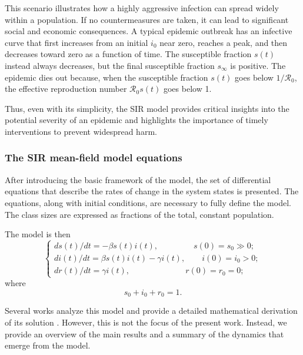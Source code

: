 \begin{itemize}
	This scenario illustrates how a highly aggressive infection can spread widely within a population. If no countermeasures are taken, it can lead to significant social and economic consequences. A typical epidemic outbreak has an infective curve that first increases from an initial $i_0$ near zero, reaches a peak, and then decreases toward zero as a function of time. The susceptible fraction $s(t)$ instead always decreases, but the final susceptible fraction $s_\infty$ is positive. The epidemic dies out because, when the susceptible fraction $s(t)$ goes below $1/\mathcal{R}_0$, the effective reproduction number $\mathcal{R}_0 s(t)$ goes below 1.
		
\end{itemize}
	Thus, even with its simplicity, the SIR model provides critical insights into the potential severity of an epidemic and highlights the importance of timely interventions to prevent widespread harm.
	

\subsubsection{The SIR mean-field model equations}
After introducing the basic framework of the model, the set of differential equations that describe the rates of change in the system states is presented. The equations, along with initial conditions, are necessary to fully define the model. The class sizes are expressed as fractions of the total, constant population.

The model is then
\begin{equation}
	\begin{cases}
		ds(t) / dt = -\beta s(t) i(t), \;\qquad \qquad s(0) = s_0 \gg 0;\\
		di(t) / dt =  \beta s(t) i(t) - \gamma i(t), \qquad i(0) = i_0 > 0;\\
		dr(t) / dt =  \gamma i(t), \qquad \; \, \;\quad \quad \qquad r(0) = r_0 = 0;
	\end{cases}
\end{equation}
where
\begin{equation}
s_0 + i_0 + r_0 = 1.
\end{equation}

Several works analyze this model and provide a detailed mathematical derivation of its solution \cite{diekmann2000mathematical,akinboro2014numerical,Turkyilmazoglu_2021}. However, this is not the focus of the present work. Instead, we provide an overview of the main results and a summary of the dynamics that emerge from the model.

